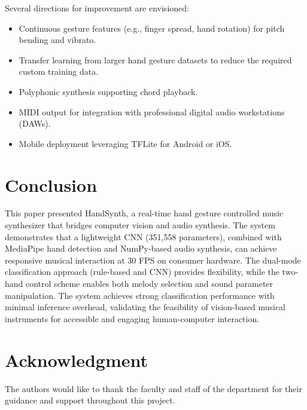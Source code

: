 \documentclass[conference]{IEEEtran}
\begin{document}
Several directions for improvement are envisioned:

\begin{itemize}
\item Continuous gesture features (e.g., finger spread, hand rotation) for pitch bending and vibrato.
\item Transfer learning from larger hand gesture datasets to reduce the required custom training data.
\item Polyphonic synthesis supporting chord playback.
\item MIDI output for integration with professional digital audio workstations (DAWs).
\item Mobile deployment leveraging TFLite for Android or iOS.
\end{itemize}

\section{Conclusion}

This paper presented HandSynth, a real-time hand gesture controlled music synthesizer that bridges computer vision and audio synthesis. The system demonstrates that a lightweight CNN (351,558 parameters), combined with MediaPipe hand detection and NumPy-based audio synthesis, can achieve responsive musical interaction at 30 FPS on consumer hardware. The dual-mode classification approach (rule-based and CNN) provides flexibility, while the two-hand control scheme enables both melody selection and sound parameter manipulation. The system achieves strong classification performance with minimal inference overhead, validating the feasibility of vision-based musical instruments for accessible and engaging human-computer interaction.

\section*{Acknowledgment}

The authors would like to thank the faculty and staff of the department for their guidance and support throughout this project.
\end{document}
